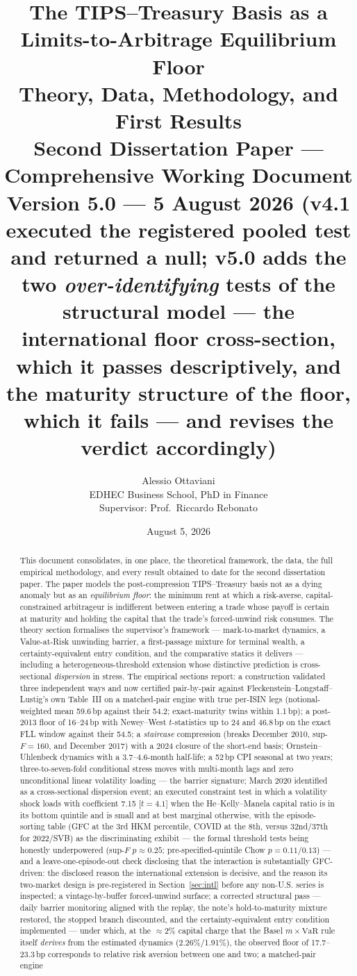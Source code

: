 \documentclass[11pt]{article}
\title{\textbf{The TIPS--Treasury Basis as a Limits-to-Arbitrage Equilibrium Floor}\\[5pt] \large Theory, Data, Methodology, and First Results\\ \normalsize Second Dissertation Paper --- Comprehensive Working Document\\[3pt] \small Version 5.0 --- 5 August 2026 (v4.1 executed the registered pooled test and returned a null; v5.0 adds the two \emph{over-identifying} tests of the structural model --- the international floor cross-section, which it passes descriptively, and the maturity structure of the floor, which it fails --- and revises the verdict accordingly)}
\author{Alessio Ottaviani\\ EDHEC Business School, PhD in Finance\\[4pt] \small Supervisor: Prof.\ Riccardo Rebonato}
\date{August 5, 2026}
\newcommand{\VaR}{\mathrm{VaR}}
\begin{document}
\maketitle

\begin{abstract}
\noindent This document consolidates, in one place, the theoretical framework, the data, the full empirical methodology, and every result obtained to date for the second dissertation paper. The paper models the post-compression TIPS--Treasury basis not as a dying anomaly but as an \emph{equilibrium floor}: the minimum rent at which a risk-averse, capital-constrained arbitrageur is indifferent between entering a trade whose payoff is certain at maturity and holding the capital that the trade's forced-unwind risk consumes. The theory section formalises the supervisor's framework --- mark-to-market dynamics, a Value-at-Risk unwinding barrier, a first-passage mixture for terminal wealth, a certainty-equivalent entry condition, and the comparative statics it delivers --- including a heterogeneous-threshold extension whose distinctive prediction is cross-sectional \emph{dispersion} in stress. The empirical sections report: a construction validated three independent ways and now certified pair-by-pair against Fleckenstein--Longstaff--Lustig's own Table~III on a matched-pair engine with true per-ISIN legs (notional-weighted mean 59.6\,bp against their 54.2; exact-maturity twins within 1.1\,bp); a post-2013 floor of 16--24\,bp with Newey--West $t$-statistics up to 24 and 46.8\,bp on the exact FLL window against their 54.5; a \emph{staircase} compression (breaks December 2010, sup-$F=160$, and December 2017) with a 2024 closure of the short-end basis; Ornstein--Uhlenbeck dynamics with a 3.7--4.6-month half-life; a 52\,bp CPI seasonal at two years; three-to-seven-fold conditional stress moves with multi-month lags and zero unconditional linear volatility loading --- the barrier signature; March 2020 identified as a cross-sectional dispersion event; an executed constraint test in which a volatility shock loads with coefficient 7.15 [$t=4.1$] when the He--Kelly--Manela capital ratio is in its bottom quintile and is small and at best marginal otherwise, with the episode-sorting table (GFC at the 3rd HKM percentile, COVID at the 8th, versus 32nd/37th for 2022/SVB) as the discriminating exhibit --- the formal threshold tests being honestly underpowered (sup-$F$ $p\approx0.25$; pre-specified-quintile Chow $p=0.11$/$0.13$) --- and a leave-one-episode-out check disclosing that the interaction is substantially GFC-driven: the disclosed reason the international extension is decisive, and the reason its two-market design is pre-registered in Section~\ref{sec:intl} before any non-U.S. series is inspected; a vintage-by-buffer forced-unwind surface; a corrected structural pass --- daily barrier monitoring aligned with the replay, the note's hold-to-maturity mixture restored, the stopped branch discounted, and the certainty-equivalent entry condition implemented --- under which, at the $\approx$2\% capital charge that the Basel $m\times\VaR$ rule itself \emph{derives} from the estimated dynamics (2.26\%/1.91\%), the observed floor of 17.7--23.3\,bp corresponds to relative risk aversion between one and two; a matched-pair engine 
\end{abstract}
\end{document}
